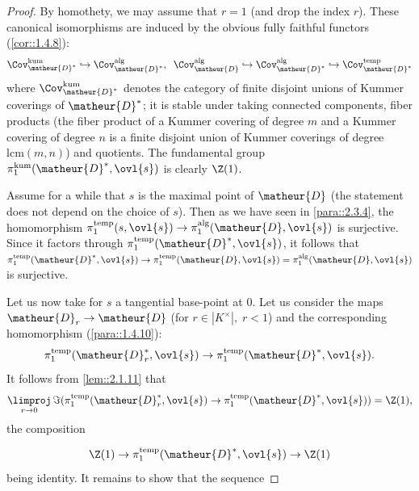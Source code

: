 \begin{proof}
 By homothety, we may assume that $r=1$ (and drop the index
 $r$). These canonical isomorphisms are induced by the 
 obvious fully faithful functors (\cf \ref{cor::1.4.8}):
 \begin{equation*}
 \Cov^{\mathrm{kum}}_{\matheur{D}^\ast} \hookrightarrow
 \Cov^{\mathrm{alg}}_{\matheur{D}^\ast},\;\; 
 \Cov^{\mathrm{alg}}_{\matheur{D}} \hookrightarrow 
 \Cov^{\mathrm{alg}}_{\matheur{D}^\ast}\hookrightarrow
 \Cov^{\mathrm{temp}}_{\matheur{D}^\ast} 
 \end{equation*}
 where $\Cov^{\mathrm{kum}}_{\matheur{D}^\ast}$ denotes the category of
 finite disjoint unions of Kummer coverings of $\matheur{D}^\ast$; it is
 stable under taking connected 
 components, fiber products (the fiber product of a Kummer covering of
 degree $m$ and a Kummer covering of degree $n$ is a finite disjoint
 union of Kummer coverings of degree $\mathrm{lcm}(m,n)$) and quotients. The
 fundamental group $\pi_1^{\mathrm{kum}}(\matheur{D}^\ast,\ovl{s})$ is
 clearly $\Z(1)$.

 Assume for a while that $s$ is the maximal point of $\matheur{D}$ (the
 statement does not depend on the choice of $s$). Then as we have seen in
 \ref{para::2.3.4}, 
 the homomorphism $\pi_1^{\mathrm{temp}}(s,\ovl{s})\to
 \pi_1^{\mathrm{alg}}(\matheur{D},\ovl{s})$ is surjective. Since it
 factors through 
 $\pi_1^{\mathrm{temp}}(\matheur{D}^\ast,\ovl{s})$, it follows that
 $\pi_1^{\mathrm{temp}}(\matheur{D}^\ast,\ovl{s})\to\pi_1^{\mathrm{temp}}
 (\matheur{D},\ovl{s}) 
 = \pi_1^{\mathrm{alg}}(\matheur{D} ,\ovl{s})$ is surjective.
 
 Let us now take for $s$ a tangential base-point at $0$. Let us consider 
 the maps $\matheur{D}_r\to \matheur{D}$ (for $r\in {|K^\times|},\;r<1$) 
 and the corresponding homomorphism (\cf \ref{para::1.4.10}):
 \begin{equation*}
 \pi_1^{\mathrm{temp}}(\matheur{D}_r^\ast,\ovl{s})\to
 \pi_1^{\mathrm{temp}}(\matheur{D}^\ast,\ovl{s}).
 \end{equation*}
 It follows from \ref{lem::2.1.11} that 
 \begin{equation*}
 \underset{r\to 0}\limproj\,
  \Im(\pi_1^{\mathrm{temp}}(\matheur{D}_r^\ast,\ovl{s})\to
  \pi_1^{\mathrm{temp}}(\matheur{D}^\ast,\ovl{s})) = \Z(1),
 \end{equation*}
 the composition 

 \begin{equation*}
 \Z(1)\to \pi_1^{\mathrm{temp}}(\matheur{D}^\ast,\ovl{s})\to\Z(1)
 \end{equation*}
 being identity. It remains to show that the sequence 


\end{proof}
